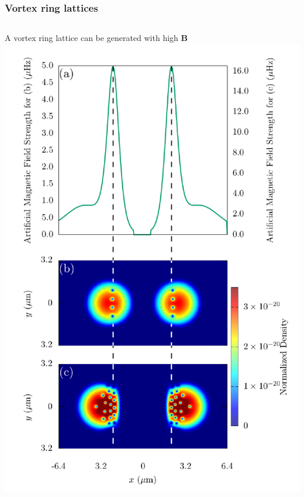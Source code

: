 \documentclass{beamer}
\begin{document}
\begin{frame}
\frametitle{Vortex ring lattices}

\begin{columns}
A vortex ring lattice can be generated with high $\mathbf{B}$
\includegraphics[width=\linewidth]{../data/3d/vortex_line_all.pdf}
\end{columns}
\end{frame}
\end{document}
